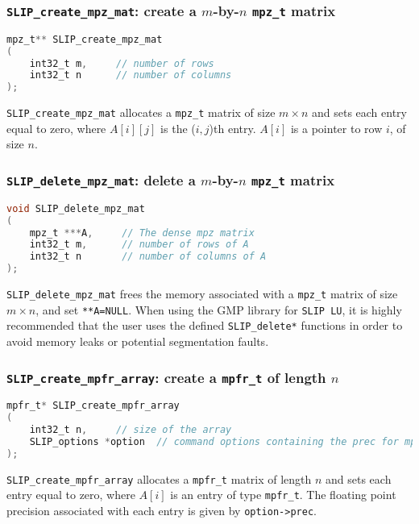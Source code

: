 \documentclass[11pt]{article}
\theoremstyle{definition}
\begin{document}
\cprotect\subsubsection{\verb|SLIP_create_mpz_mat|: create a $m$-by-$n$ \verb|mpz_t| matrix}

\begin{lstlisting}[language=C,frame=single]
mpz_t** SLIP_create_mpz_mat
(
    int32_t m,     // number of rows
    int32_t n      // number of columns
);
\end{lstlisting}

\verb|SLIP_create_mpz_mat| allocates a \verb|mpz_t| matrix of size $m \times n$ and sets each entry equal to zero, where $A[i][j]$ is the ($i,j$)th entry. $A[i]$ is a pointer to row $i$, of size $n$.


\cprotect\subsubsection{\verb|SLIP_delete_mpz_mat|: delete a $m$-by-$n$ \verb|mpz_t| matrix}


\begin{lstlisting}[language=C,frame=single]
void SLIP_delete_mpz_mat
(
    mpz_t ***A,     // The dense mpz matrix
    int32_t m,      // number of rows of A
    int32_t n       // number of columns of A
);
\end{lstlisting}

\verb|SLIP_delete_mpz_mat| frees the memory associated with a \verb|mpz_t| matrix of size $m \times n$, and set \verb|**A=NULL|. When using the GMP library for \verb|SLIP LU|, it is highly recommended that the user uses the defined \verb|SLIP_delete*| functions in order to avoid memory leaks or potential segmentation faults.

\cprotect\subsubsection{\verb|SLIP_create_mpfr_array|: create a \verb|mpfr_t| of length $n$}


\begin{lstlisting}[language=C,frame=single]
mpfr_t* SLIP_create_mpfr_array
(
    int32_t n,     // size of the array
    SLIP_options *option  // command options containing the prec for mpfr
);
\end{lstlisting}

\verb|SLIP_create_mpfr_array| allocates a \verb|mpfr_t| matrix of length $n$ and sets each entry equal to zero, where  $A[i]$ is an entry of type \verb|mpfr_t|. The floating point precision associated with each entry is given by \verb|option->prec|.
\end{document}
